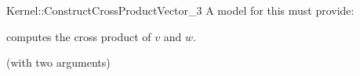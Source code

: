 \begin{ccRefFunctionObjectConcept}{Kernel::ConstructCrossProductVector_3}
A model for this must provide:



            {computes the cross product of $v$ and $w$.}

\ccRefines
{} (with two arguments)

\ccSeeAlso

\\
\\

\end{ccRefFunctionObjectConcept}
